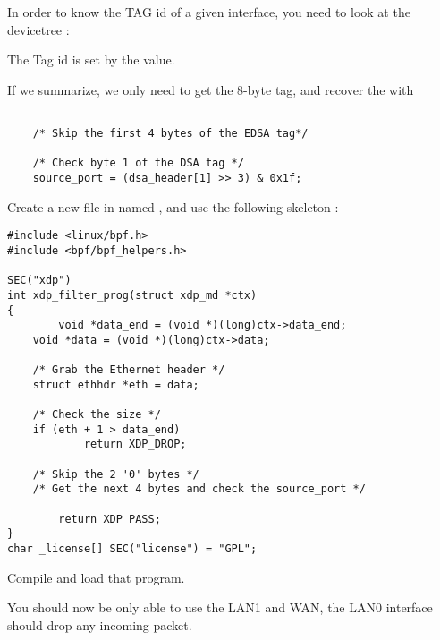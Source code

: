 In order to know the TAG id of a given interface, you need to look at the devicetree :

The Tag id is set by the  value.

If we summarize, we only need to get the 8-byte tag, and recover the  with

\begin{verbatim}

    /* Skip the first 4 bytes of the EDSA tag*/

    /* Check byte 1 of the DSA tag */
    source_port = (dsa_header[1] >> 3) & 0x1f;

\end{verbatim}

Create a new file in  named , and use
the following skeleton :

\begin{verbatim}
#include <linux/bpf.h>
#include <bpf/bpf_helpers.h>

SEC("xdp")
int xdp_filter_prog(struct xdp_md *ctx)
{
        void *data_end = (void *)(long)ctx->data_end;
	void *data = (void *)(long)ctx->data;

	/* Grab the Ethernet header */
	struct ethhdr *eth = data;

	/* Check the size */
	if (eth + 1 > data_end)
	        return XDP_DROP;

	/* Skip the 2 '0' bytes */
	/* Get the next 4 bytes and check the source_port */

        return XDP_PASS;
}
char _license[] SEC("license") = "GPL";
\end{verbatim}

Compile and load that program.

You should now be only able to use the LAN1 and WAN, the LAN0 interface should
drop any incoming packet.

%
%
%
%
%
